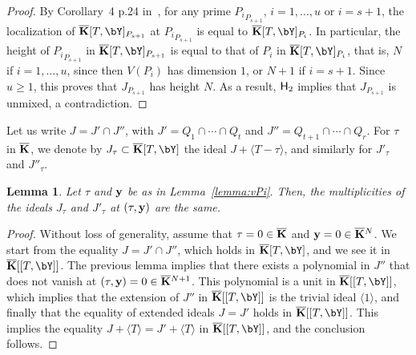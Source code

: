 \documentclass[12pt]{article}
\newtheorem{lemma}[definition]{Lemma}
\begin{document}
\begin{proof}
  By Corollary~4 p.24 in~\cite{Matsumura86}, for any prime
  ${P_i}_{P_{s+1}}$, $i=1,\dots,u$ or $i=s+1$, the localization of
  $\KKbar[T,\bY]_{P_{s+1}}$ at ${P_i}_{P_{s+1}}$ is equal to
  $\KKbar[T,\bY]_{P_{i}}$. In particular, the height of ${P_i}_{P_{s+1}}$
  in $\KKbar[T,\bY]_{P_{s+1}}$ is equal to that of $P_i$ in
  $\KKbar[T,\bY]_{P_{i}}$, that is, $N$ if $i=1,\dots,u$, since then
  $V(P_i)$ has dimension $1$, or $N+1$ if $i=s+1$. Since $u \ge 1$,
  this proves that $J_{P_{s+1}}$ has height $N$. As a result, ${\sf
    H}_2$ implies that $J_{P_{s+1}}$ is unmixed, a contradiction.
\end{proof}

Let us write $J=J' \cap J''$, with $J'=Q_1 \cap \cdots \cap Q_t$ and
$J''=Q_{t+1} \cap \cdots \cap Q_r$. For $\tau$ in $\overline{\mathbf{K}}$, we denote
by $J_\tau \subset \KKbar[T,\bY]$ the ideal $J + \langle T-\tau \rangle$,
and similarly for $J'_\tau$ and $ J''_\tau$.

\begin{lemma}\label{lemma:JJprime}
  Let $\tau$ and $\mathbf{y}$ be as in Lemma~\ref{lemma:vPi}. Then, the
  multiplicities of the ideals $J_\tau$ and $J'_\tau$ at $(\tau,\mathbf{y})$
  are the same.
\end{lemma}
\begin{proof}
  Without loss of generality, assume that $\tau=0 \in \overline{\mathbf{K}}$ and
  $\mathbf{y}=0 \in \overline{\mathbf{K}}{}^N$. We start from the equality $J=J' \cap J''$,
  which holds in $\KKbar[T,\bY]$, and we see it in $\KKbar[[T,\bY]]$.  The
  previous lemma implies that there exists a polynomial in $J''$ that
  does not vanish at $(\tau,\mathbf{y})=0 \in \overline{\mathbf{K}}{}^{N+1}$.  This polynomial
  is a unit in $\KKbar[[T,\bY]]$, which implies that the extension of
  $J''$ in $\KKbar[[T,\bY]]$ is the trivial ideal $\langle 1 \rangle$, and
  finally that the equality of extended ideals $J=J'$ holds in
  $\KKbar[[T,\bY]]$. This implies the equality $J+\langle T \rangle
  =J'+\langle T \rangle $ in $\KKbar[[T,\bY]]$, and the conclusion
  follows.
\end{proof}
\end{document}
